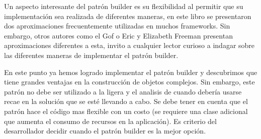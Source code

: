 Un aspecto interesante del patrón builder es su flexibilidad al permitir que su implementación sea realizada de diferentes maneras, en este libro se presentaron dos aproximaciones frecuentemente utilizadas en muchos frameworks. Sin embargo, otros autores como el Gof o Eric y Elizabeth Freeman presentan aproximaciones diferentes a esta, invito a cualquier lector curioso a indagar sobre las diferentes maneras de implementar el patrón builder. 

En este punto ya hemos logrado implementar el patrón builder y descubrimos que tiene grandes ventajas en la construcción de objetos complejos. Sin embargo, este patrón no debe ser utilizado a la ligera y el analisis de cuando debería usarse recae en la solución que se esté llevando a cabo. Se debe tener en cuenta que el patrón hace el código mas flexible con un costo (se requiere una clase adicional que aumenta el consumo de recursos en la aplicación). Es criterio del desarrollador decidir cuando el patrón builder es la mejor opción.